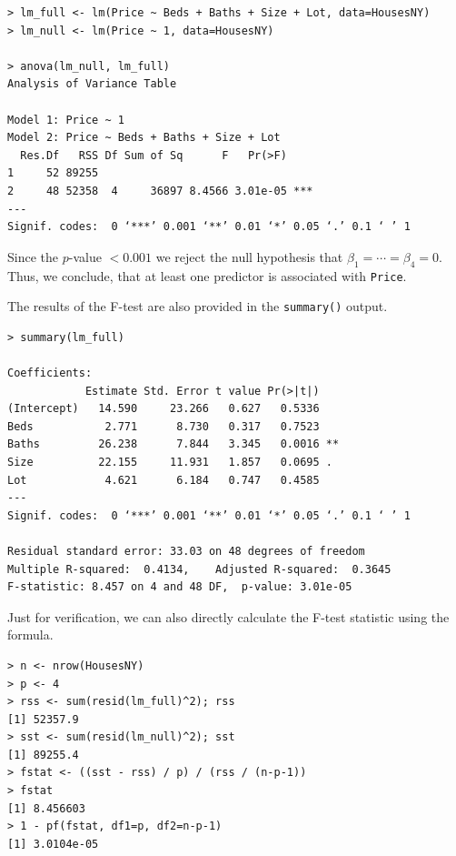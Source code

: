 \documentclass[10pt]{beamer}\usepackage[]{graphicx}\usepackage[]{color}
\begin{document}
\begin{frame}[fragile]
\small
\begin{verbatim}
> lm_full <- lm(Price ~ Beds + Baths + Size + Lot, data=HousesNY)
> lm_null <- lm(Price ~ 1, data=HousesNY)

> anova(lm_null, lm_full)
Analysis of Variance Table

Model 1: Price ~ 1
Model 2: Price ~ Beds + Baths + Size + Lot
  Res.Df   RSS Df Sum of Sq      F   Pr(>F)    
1     52 89255                                 
2     48 52358  4     36897 8.4566 3.01e-05 ***
---
Signif. codes:  0 ‘***’ 0.001 ‘**’ 0.01 ‘*’ 0.05 ‘.’ 0.1 ‘ ’ 1
\end{verbatim}

\normalsize
Since the $p$-value $<0.001$ we reject the null hypothesis that $\beta_1 = \cdots = \beta_4 =0$.  Thus, we conclude, that at least one predictor is associated with \texttt{Price}.
\end{frame}

\begin{frame}[fragile]
The results of the F-test are also provided in the \texttt{summary()} output.\\
\small
\begin{verbatim}
> summary(lm_full)

Coefficients:
            Estimate Std. Error t value Pr(>|t|)   
(Intercept)   14.590     23.266   0.627   0.5336   
Beds           2.771      8.730   0.317   0.7523   
Baths         26.238      7.844   3.345   0.0016 **
Size          22.155     11.931   1.857   0.0695 . 
Lot            4.621      6.184   0.747   0.4585   
---
Signif. codes:  0 ‘***’ 0.001 ‘**’ 0.01 ‘*’ 0.05 ‘.’ 0.1 ‘ ’ 1

Residual standard error: 33.03 on 48 degrees of freedom
Multiple R-squared:  0.4134,	Adjusted R-squared:  0.3645 
F-statistic: 8.457 on 4 and 48 DF,  p-value: 3.01e-05
\end{verbatim}
\end{frame}

\begin{frame}[fragile]
Just for verification, we can also directly calculate the F-test statistic using the formula.
\begin{verbatim}
> n <- nrow(HousesNY)
> p <- 4
> rss <- sum(resid(lm_full)^2); rss
[1] 52357.9
> sst <- sum(resid(lm_null)^2); sst
[1] 89255.4
> fstat <- ((sst - rss) / p) / (rss / (n-p-1))
> fstat
[1] 8.456603
> 1 - pf(fstat, df1=p, df2=n-p-1)
[1] 3.0104e-05
\end{verbatim}
\end{frame}
\end{document}
